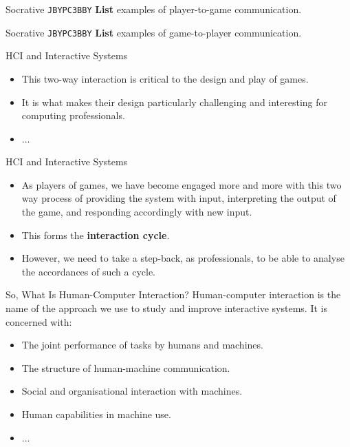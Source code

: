 \begin{frame}[fragile]{Socrative \texttt{JBYPC3BBY}}
    \textbf{List} examples of player-to-game communication.
\end{frame}

\begin{frame}[fragile]{Socrative \texttt{JBYPC3BBY}}
    \textbf{List} examples of game-to-player communication.
\end{frame}

\begin{frame}{HCI and Interactive Systems}
	\begin{itemize}
		\item This two-way interaction is critical to the design and play of games.
		\item  It is what makes their design particularly challenging and interesting for computing professionals. 
		\item ...
	\end{itemize}
\end{frame}

\begin{frame}{HCI and Interactive Systems}
	\begin{itemize}
		\item As players of games, we have become engaged more and more with this two way process of providing
		the system with input, interpreting the output of the game, and responding accordingly with new input.
		\item This forms the \textbf{interaction cycle}.
		\item However, we need to take a step-back, as professionals, to be able to analyse the accordances of such a cycle.
	\end{itemize}
\end{frame}

\begin{frame}{So, What Is Human-Computer Interaction?}
	Human-computer interaction is the name of the approach we use to study and improve interactive systems. It is concerned with:
	\begin{itemize}
		\item The joint performance of tasks by humans and machines. 
		\item The structure of human-machine communication.
		\item Social and organisational interaction with machines.
		\item Human capabilities in machine use.
		\item ...
	\end{itemize}
\end{frame}

